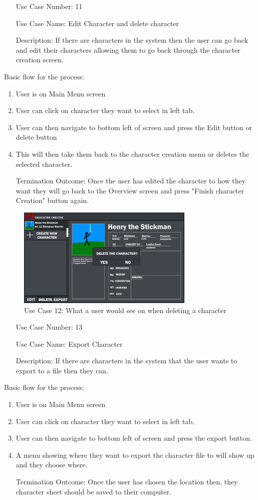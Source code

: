 \documentclass[10pt,conference,onecolumn,compsoc]{IEEEtran}
\begin{document}
\begin{itemize}
\item[Use Case Number:] 11
\item[Use Case Name:] Edit Character and delete character
\item[Description:] If there are characters in the system then the user can go back and edit their characters allowing them to go back through the character creation screen.
\end{itemize}
Basic flow for the process:
\begin{enumerate}
\item User is on Main Menu screen
\item User can click on character they want to select in left tab.
\item User can then navigate to bottom left of screen and press the Edit button or delete button
\item This will then take them back to the character creation menu or deletes the selected character.
\item[Termination Outcome:] Once the user has edited the character to how they want they will go back to the Overview screen and press "Finish character Creation" button again.
\end{enumerate}

\begin{figure}[ht!]
\includegraphics[height=180px, width=320px]{CSCI 352 Interface Mockups/Interface Mockup 1.5.png}
\caption{Use Case 12: What a user would see on when deleting a character}
\centering
\label{mockup}
\end{figure}

\begin{itemize}
\item[Use Case Number:] 13
\item[Use Case Name:] Export Character
\item[Description:] If there are characters in the system that the user wants to export to a file then they can.
\end{itemize}
Basic flow for the process:
\begin{enumerate}
\item User is on Main Menu screen
\item User can click on character they want to select in left tab.
\item User can then navigate to bottom left of screen and press the export button.
\item A menu showing where they want to export the character file to will show up and they choose where.
\item[Termination Outcome:] Once the user has chosen the location then, they character sheet should be saved to their computer.
\end{enumerate}
\end{document}
